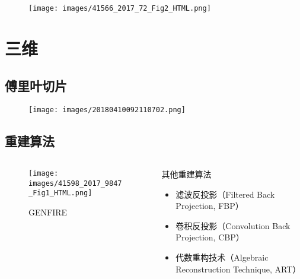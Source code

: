 \documentclass[12pt,aspectratio=169]{beamer} %
\begin{document}
\begin{frame}
    \begin{figure}
    \end{figure}
\end{frame}

\begin{frame}
    \begin{figure}
        \texttt{[image: images/41566\_2017\_72\_Fig2\_HTML.png]}
    \end{figure}
\end{frame}

\section{三维}

\subsection{傅里叶切片}

\begin{frame}
    \begin{figure}
        \texttt{[image: images/20180410092110702.png]}
    \end{figure}
\end{frame}

\subsection{重建算法}

\begin{frame}
    \begin{columns}
        \begin{column}{0.4\textwidth}
            \begin{figure}
                \texttt{[image: images/41598\_2017\_9847\_Fig1\_HTML.png]}
                \caption{GENFIRE}
            \end{figure}
        \end{column}
        \begin{column}{0.6\textwidth}
            \begin{block}{其他重建算法}
                \begin{itemize}
                    \item 滤波反投影（Filtered Back Projection, FBP）
                    \item 卷积反投影（Convolution Back Projection, CBP）
                    \item 代数重构技术（Algebraic Reconstruction Technique, ART）
                \end{itemize}
            \end{block}
        \end{column}
    \end{columns}
\end{frame}
\end{document}
